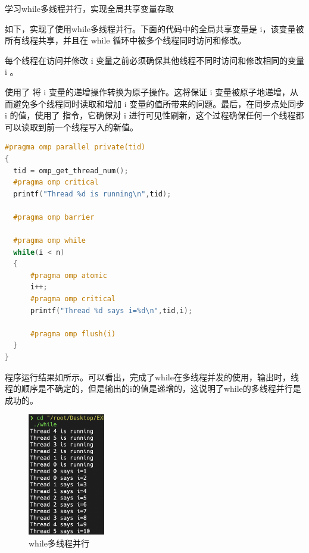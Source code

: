 \documentclass[lang=cn,a4paper,chinesefont=founder,bibend=bibtex]{shu-lab-report}
\begin{document}
\begin{tcolorbox}[title=要求4]
  学习while多线程并行，实现全局共享变量存取
\end{tcolorbox}

如下，实现了使用while多线程并行。下面的代码中的全局共享变量是 i，该变量被所有线程共享，并且在 while 循环中被多个线程同时访问和修改。

每个线程在访问并修改 i 变量之前必须确保其他线程不同时访问和修改相同的变量 i 。

使用了  将 i 变量的递增操作转换为原子操作。这将保证 i 变量被原子地递增，从而避免多个线程同时读取和增加 i 变量的值所带来的问题。最后，在同步点处同步 i 的值，使用了  指令，它确保对 i 进行可见性刷新，这个过程确保任何一个线程都可以读取到前一个线程写入的新值。

\begin{lstlisting}[language=c]
#pragma omp parallel private(tid)
{
  tid = omp_get_thread_num();
  #pragma omp critical
  printf("Thread %d is running\n",tid);

  #pragma omp barrier

  #pragma omp while
  while(i < n) 
  {
      #pragma omp atomic
      i++;
      #pragma omp critical
      printf("Thread %d says i=%d\n",tid,i);

      #pragma omp flush(i)
  }
}
\end{lstlisting}

程序运行结果如所示。可以看出，完成了while在多线程并发的使用，输出时，线程的顺序是不确定的，但是输出的i的值是递增的，这说明了while的多线程并行是成功的。

\newpage

\begin{figure}
  \centering
  \includegraphics[width=0.3\textwidth]{image/2.jpg}
  \caption{while多线程并行}
  \label{fig:2}
\end{figure}
\end{document}
